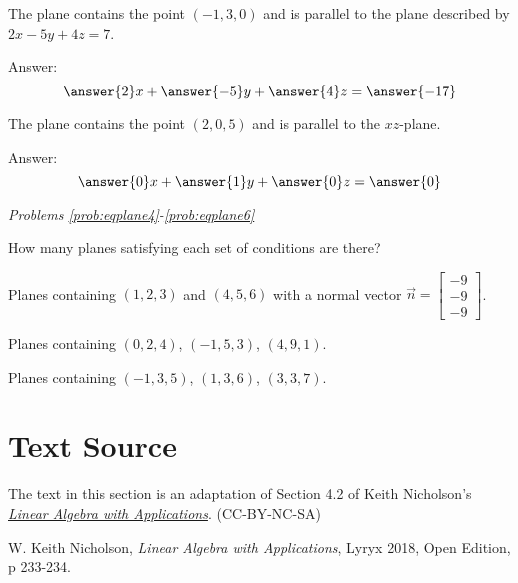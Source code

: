 \documentclass{ximera}
\begin{document}
  \begin{problem}\label{prob:eqplane2}
  The plane contains the point $(-1, 3, 0)$ and is parallel to the plane described by $2x-5y+4z=7$.
  
  Answer:
  $$\answer{2}x+\answer{-5}y+\answer{4}z=\answer{-17}$$
  \end{problem}
  
  \begin{problem}\label{prob:eqplane3}
  The plane contains the point $(2, 0, 5)$ and is parallel to the $xz$-plane.
  
  Answer:
  $$\answer{0}x+\answer{1}y+\answer{0}z=\answer{0}$$
  \end{problem}



\emph{Problems \ref{prob:eqplane4}-\ref{prob:eqplane6}}

How many planes satisfying each set of conditions are there?

\begin{problem}\label{prob:eqplane4}
Planes containing $(1, 2, 3)$ and $(4, 5, 6)$ with a normal vector $\vec{n}=\begin{bmatrix}-9\\-9\\-9\end{bmatrix}$.
\begin{multipleChoice}
 \end{multipleChoice}
\end{problem}

\begin{problem}\label{prob:eqplane5}
Planes containing $(0,2, 4)$, $(-1, 5, 3)$, $(4, 9, 1)$.
\begin{multipleChoice}
 \end{multipleChoice}
\end{problem}

\begin{problem}\label{prob:eqplane6}
Planes containing $(-1, 3, 5)$, $(1, 3, 6)$, $(3, 3, 7)$.
\begin{multipleChoice}
 \end{multipleChoice}
\end{problem}



\section*{Text Source}
The text in this section is an adaptation of Section 4.2 of Keith Nicholson's \href{https://open.umn.edu/opentextbooks/textbooks/linear-algebra-with-applications}{\it Linear Algebra with Applications}. (CC-BY-NC-SA)

W. Keith Nicholson, {\it Linear Algebra with Applications}, Lyryx 2018, Open Edition, p 233-234.
\end{document}
